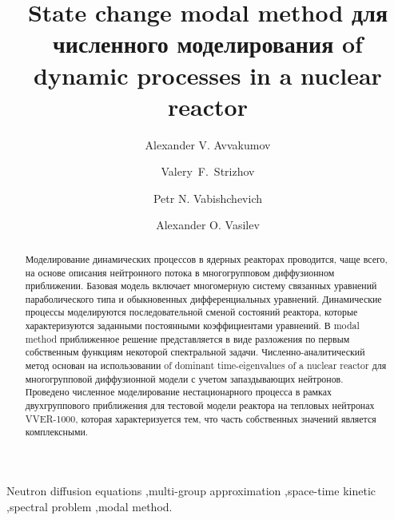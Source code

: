 \documentclass[authoryear]{elsarticle}
\begin{document}
\begin{frontmatter}

\title{State change modal method для численного моделирования of dynamic processes in a nuclear reactor}

\author[ki]{Alexander V. Avvakumov}

\author[nsi]{Valery~F.~Strizhov}

\author[nsi,univ]{Petr N. Vabishchevich}

\author[univ]{Alexander O. Vasilev}

\address[ki]{National Research Center \emph{Kurchatov Institute},  1, Sq. Academician Kurchatov, Moscow, Russia}
\address[nsi]{Nuclear Safety Institute, Russian Academy of Sciences, 52, B. Tulskaya, Moscow, Russia}
\address[univ]{North-Eastern Federal University, 58, Belinskogo, Yakutsk, Russia}


\begin{abstract}
Моделирование динамических процессов в ядерных реакторах проводится, 
чаще всего, на основе описания нейтронного потока в многогрупповом диффузионном приближении. 
Базовая модель включает многомерную систему связанных уравнений параболического типа и обыкновенных дифференциальных уравнений. 
Динамические процессы моделируются последовательной сменой состояний реактора, которые характеризуются заданными 
постоянными коэффициентами уравнений.
В modal method приближенное решение представляется в виде разложения по первым собственным функциям 
некоторой спектральной задачи. Численно-аналитический метод основан на использовании of dominant time-eigenvalues of
a nuclear reactor для  многогрупповой диффузионной модели с учетом запаздывающих нейтронов.
Проведено численное моделирование нестационарного процесса в рамках 
двухгруппового приближения для тестовой модели реактора на тепловых нейтронах VVER-1000,
которая характеризуется тем, что часть собственных значений является комплексными.
\end{abstract}

\begin{keyword}
Neutron diffusion equations \sep  multi-group approximation \sep space-time kinetic 
\sep spectral problem \sep modal method.

\end{keyword}

\end{frontmatter}
\end{document}

